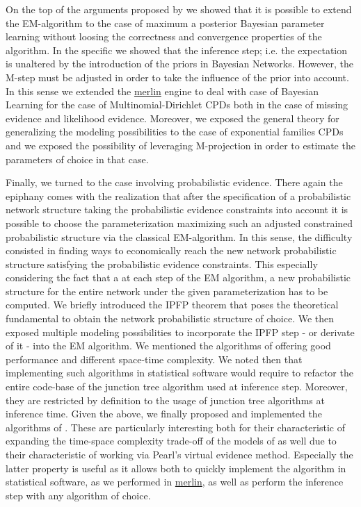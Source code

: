 \documentclass[11pt]{article}
\begin{document}
\begin{article}
On the top of the arguments proposed by \cite{Wasserkrug_all} we
showed that it is possible to extend the EM-algorithm to the case of
maximum a posterior Bayesian parameter learning without loosing the
correctness and convergence properties of the algorithm. In the
specific we showed that the inference step; i.e. the expectation is
unaltered by the introduction of the priors in Bayesian
Networks. However, the M-step must be adjusted in order to take the
influence of the prior into account. In this sense we extended the
\href{https://github.com/radum2275/merlin}{merlin} engine to deal with case of Bayesian Learning for the case of
Multinomial-Dirichlet CPDs both in the case of missing evidence and
likelihood evidence. Moreover, we exposed the general theory for
generalizing the modeling possibilities to the case of exponential
families CPDs and we exposed the possibility of leveraging
M-projection in order to estimate the parameters of choice in that
case.

Finally, we turned to the case involving probabilistic
evidence. There again the epiphany comes with the realization that
after the specification of a probabilistic network structure taking
the probabilistic evidence constraints into account it is possible
to choose the parameterization maximizing such an adjusted
constrained probabilistic structure via the classical EM-algorithm.
In this sense, the difficulty consisted in finding ways to
economically reach the new network probabilistic structure
satisfying the probabilistic evidence constraints. This especially
considering the fact that a at each step of the EM algorithm, a new
probabilistic structure for the entire network under the given
parameterization has to be computed. We briefly introduced the IPFP
theorem that poses the theoretical fundamental to obtain the network
probabilistic structure of choice. We then exposed multiple modeling
possibilities to incorporate the IPFP step - or derivate of it -
into the EM algorithm. We mentioned the algorithms of
\cite{Valtorta_2002} offering good performance and different
space-time complexity. We noted then that implementing such
algorithms in statistical software would require to refactor the
entire code-base of the junction tree algorithm used at inference
step. Moreover, they are restricted by definition to the usage of
junction tree algorithms at inference time. Given the above, we
finally proposed and implemented the algorithms of
\cite{PENG_2010}. These are particularly interesting both for their
characteristic of expanding the time-space complexity trade-off
of the models of \cite{Valtorta_2002} as well due to their
characteristic of working via Pearl's virtual evidence
method. Especially the latter property is useful as it allows both
to quickly implement the algorithm in statistical software, as we
performed in \href{https://github.com/radum2275/merlin}{merlin}, as well as perform the inference step with any
algorithm of choice.


\end{article}
\end{document}
